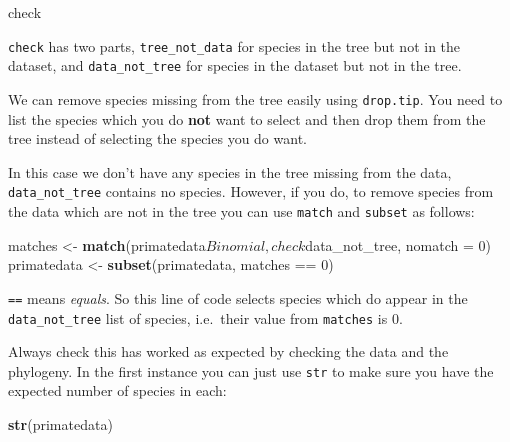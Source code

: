 \documentclass[]{book}
\newenvironment{Shaded}{\begin{snugshade}}{\end{snugshade}}
\newcommand{\KeywordTok}[1]{\textcolor[rgb]{0.13,0.29,0.53}{\textbf{{#1}}}}
\newcommand{\DataTypeTok}[1]{\textcolor[rgb]{0.13,0.29,0.53}{{#1}}}
\newcommand{\DecValTok}[1]{\textcolor[rgb]{0.00,0.00,0.81}{{#1}}}
\newcommand{\StringTok}[1]{\textcolor[rgb]{0.31,0.60,0.02}{{#1}}}
\newcommand{\NormalTok}[1]{{#1}}
\begin{document}
\begin{Shaded}
\begin{Highlighting}[]
\NormalTok{check}
\end{Highlighting}
\end{Shaded}

\texttt{check} has two parts, \texttt{tree\_not\_data} for species in
the tree but not in the dataset, and \texttt{data\_not\_tree} for
species in the dataset but not in the tree.

We can remove species missing from the tree easily using
\texttt{drop.tip}. You need to list the species which you do
\textbf{not} want to select and then drop them from the tree instead of
selecting the species you do want.

\begin{Shaded}
\end{Shaded}

In this case we don't have any species in the tree missing from the
data, \texttt{data\_not\_tree} contains no species. However, if you do,
to remove species from the data which are not in the tree you can use
\texttt{match} and \texttt{subset} as follows:

\begin{Shaded}
\begin{Highlighting}[]
\NormalTok{matches <-}\StringTok{ }\KeywordTok{match}\NormalTok{(primatedata$Binomial, check$data_not_tree, }\DataTypeTok{nomatch =} \DecValTok{0}\NormalTok{)}
\NormalTok{primatedata <-}\StringTok{ }\KeywordTok{subset}\NormalTok{(primatedata, matches ==}\StringTok{ }\DecValTok{0}\NormalTok{)}
\end{Highlighting}
\end{Shaded}

\texttt{==} means \emph{equals}. So this line of code selects species
which do appear in the \texttt{data\_not\_tree} list of species,
i.e.~their value from \texttt{matches} is 0.

Always check this has worked as expected by checking the data and the
phylogeny. In the first instance you can just use \texttt{str} to make
sure you have the expected number of species in each:

\begin{Shaded}
\begin{Highlighting}[]
\KeywordTok{str}\NormalTok{(primatedata)}
\end{Highlighting}
\end{Shaded}
\end{document}
